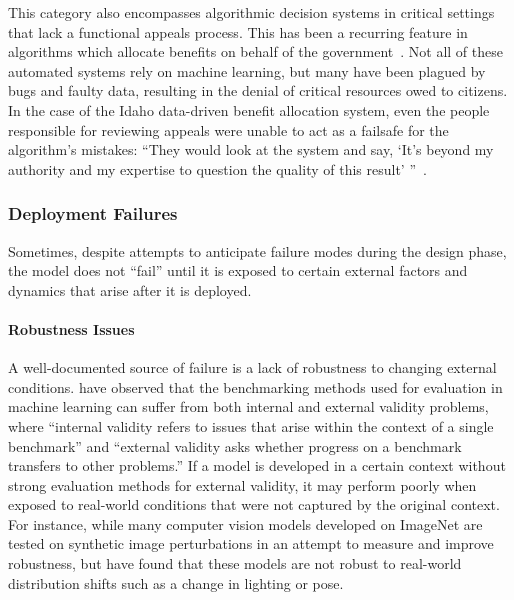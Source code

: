 \documentclass[acmconf,manuscript,screen,natbib=true]{acmart}
\begin{document}
This category also encompasses algorithmic decision systems in critical settings that lack a functional appeals process. This has been a recurring feature in algorithms which allocate benefits on behalf of the government~\cite{virginia_eubanks}. Not all of these automated systems rely on machine learning, but many have been plagued by bugs and faulty data, resulting in the denial of critical resources owed to citizens. In the case of the Idaho data-driven benefit allocation system, even the people responsible for reviewing appeals were unable to act as a failsafe for the algorithm’s mistakes: ``They would look at the system and say, `It’s beyond my authority and my expertise to question the quality of this result' ''~\cite{verge_aclu_idaho}.


\subsubsection{Deployment Failures}

Sometimes, despite attempts to anticipate failure modes during the design phase, the model does not ``fail'' until it is exposed to certain external factors and dynamics that arise after it is deployed.

\paragraph{Robustness Issues}

A well-documented source of failure is a lack of robustness to changing external conditions. \citet{LiaoAreWe2021} have observed that the benchmarking methods used for evaluation in machine learning can suffer from both internal and external validity problems, where “internal validity refers to issues that arise within the context of a single benchmark” and “external validity asks whether progress on a benchmark transfers to other problems.” If a model is developed in a certain context without strong evaluation methods for external validity, it may perform poorly when exposed to real-world conditions that were not captured by the original context. For instance, while many computer vision models developed on ImageNet are tested on synthetic image perturbations in an attempt to measure and improve robustness, but \citet{measuring_robustness_to_natural_distribution_shifts} have found that these models are not robust to real-world distribution shifts such as a change in lighting or pose. 

\end{document}
